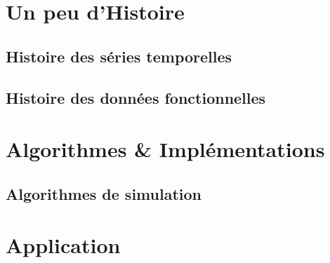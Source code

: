 





\chapter{Un peu d'Histoire}
\label{annexe:histoire}
\section{ Histoire des séries temporelles }

\pagebreak
\section{ Histoire des données fonctionnelles }

\pagebreak
% 


\chapter{Algorithmes \& Implémentations}

\label{annexe:code}
\section{Algorithmes de simulation}



%

\chapter{Application}


